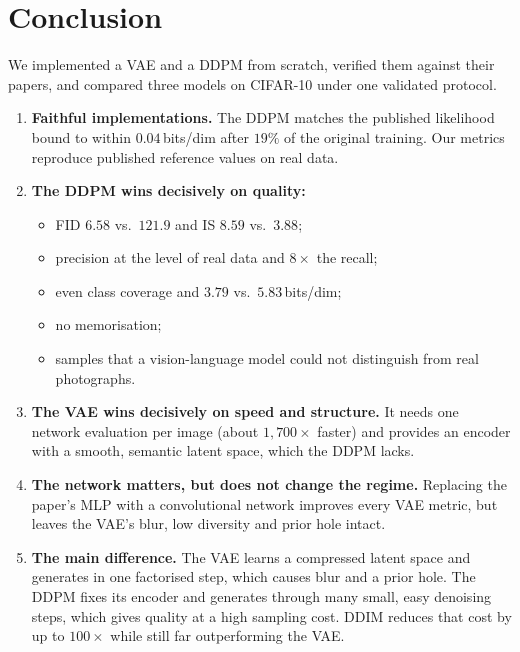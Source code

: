 \section{Conclusion}
\label{sec:conclusion}

We implemented a VAE and a DDPM from scratch, verified them against their papers, and compared three models on
CIFAR-10 under one validated protocol.
\begin{enumerate}
  \item \textbf{Faithful implementations.} The DDPM matches the published likelihood bound to within
        $0.04$\,bits/dim after $19\%$ of the original training. Our metrics reproduce published reference values
        on real data.
  \item \textbf{The DDPM wins decisively on quality:}
        \begin{itemize}
          \item FID $6.58$ vs.\ $121.9$ and IS $8.59$ vs.\ $3.88$;
          \item precision at the level of real data and $8\times$ the recall;
          \item even class coverage and $3.79$ vs.\ $5.83$\,bits/dim;
          \item no memorisation;
          \item samples that a vision-language model could not distinguish from real photographs.
        \end{itemize}
  \item \textbf{The VAE wins decisively on speed and structure.} It needs one network evaluation per image (about
        $1{,}700\times$ faster) and provides an encoder with a smooth, semantic latent space, which the DDPM lacks.
  \item \textbf{The network matters, but does not change the regime.} Replacing the paper's MLP with a
        convolutional network improves every VAE metric, but leaves the VAE's blur, low diversity and prior hole
        intact.
  \item \textbf{The main difference.} The VAE learns a compressed latent space and generates in one factorised
        step, which causes blur and a prior hole. The DDPM fixes its encoder and generates through many small,
        easy denoising steps, which gives quality at a high sampling cost. DDIM reduces that cost by up to
        $100\times$ while still far outperforming the VAE.
\end{enumerate}
